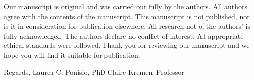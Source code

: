 \documentclass[12pt]{letter}
\begin{document}
\begin{letter}{}
  Our manuscript is original and was carried out fully by the authors.
  All authors agree with the contents of the manuscript.  This
  manuscript is not published, nor is it in consideration for
  publication elsewhere.  All research not of the authors' is fully
  acknowledged.  The authors declare no conflict of interest. All
  appropriate ethical standards were followed.  Thank you for
  reviewing our manuscript and we hope you will find it suitable for
  publication.
  
  Regards,
  Lauren C. Ponisio, PhD
  Claire Kremen, Professor
\end{letter}
\end{document}

